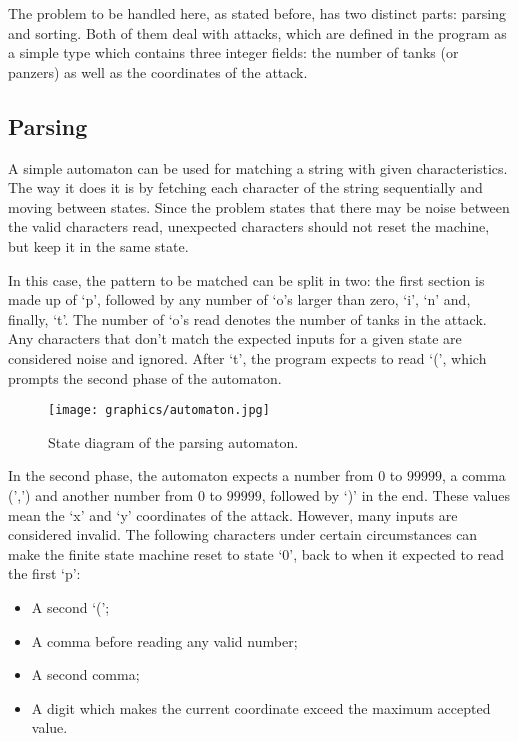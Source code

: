 \documentclass[10pt,a4paper]{article}
\numberwithin{equation}{section}
\begin{document}
The problem to be handled here, as stated before, has two distinct parts: parsing and sorting. Both of them deal with attacks, which are defined in the program as a simple type which contains three integer fields: the number of tanks (or panzers) as well as the coordinates of the attack.

\subsection{Parsing}

A simple automaton can be used for matching a string with given characteristics. The way it does it is by fetching each character of the string sequentially and moving between states. Since the problem states that there may be noise between the valid characters read, unexpected characters should not reset the machine, but keep it in the same state.

In this case, the pattern to be matched can be split in two: the first section is made up of `p', followed by any number of `o's larger than zero, `i', `n' and, finally, `t'. The number of `o's read denotes the number of tanks in the attack. Any characters that don't match the expected inputs for a given state are considered noise and ignored. After `t', the program expects to read `(', which prompts the second phase of the automaton.

\begin{figure}[H]
    \centering
    \texttt{[image: graphics/automaton.jpg]}
    \caption{State diagram of the parsing automaton.}
    \label{fig:automaton}
\end{figure}

In the second phase, the automaton expects a number from $0$ to $99999$, a comma (',') and another number from $0$ to $99999$, followed by `)' in the end. These values mean the `x' and `y' coordinates of the attack. However, many inputs are considered invalid. The following characters under certain circumstances can make the finite state machine reset to state `0', back to when it expected to read the first `p':

\begin{itemize}
    \item A second `(';
    \item A comma before reading any valid number;
    \item A second comma;
    \item A digit which makes the current coordinate exceed the maximum accepted value.
\end{itemize}
\end{document}
